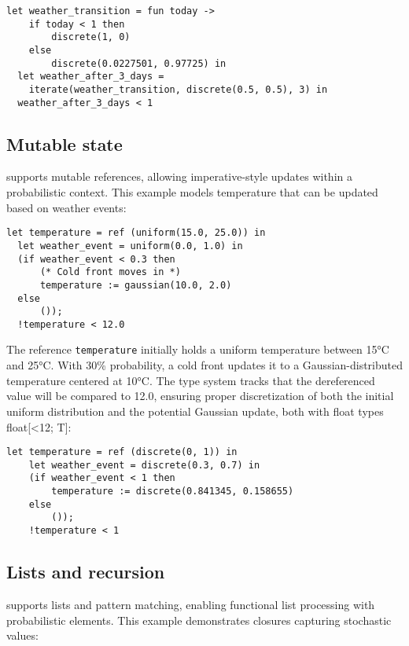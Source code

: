 \documentclass[acmsmall,screen,dvipsnames,x11names,nonacm,anonymous,review]{acmart}
\newcommand{\codetype}[1]{\textcolor{typecolor}{\ttfamily\small#1}}
\begin{document}
\begin{lstlisting}[aboveskip=1em,belowskip=1em,escapechar=!]
  let weather_transition = fun today -> 
    if today < 1 then
        discrete(1, 0)
    else
        discrete(0.0227501, 0.97725) in
  let weather_after_3_days = 
    iterate(weather_transition, discrete(0.5, 0.5), 3) in
  weather_after_3_days < 1
\end{lstlisting}


\subsection{Mutable state}

\Slice{} supports mutable references, allowing imperative-style updates within a probabilistic context. This example models temperature that can be updated based on weather events:

\begin{lstlisting}[aboveskip=1em,belowskip=1em,escapechar=!]
  let temperature = ref (uniform(15.0, 25.0)) in
  let weather_event = uniform(0.0, 1.0) in
  (if weather_event < 0.3 then
      (* Cold front moves in *)
      temperature := gaussian(10.0, 2.0)
  else
      ());
  !temperature < 12.0
\end{lstlisting}

\noindent The reference \texttt{temperature} initially holds a uniform temperature between 15°C and 25°C. With 30\% probability, a cold front updates it to a Gaussian-distributed temperature centered at 10°C. The type system tracks that the dereferenced value will be compared to 12.0, ensuring proper discretization of both the initial uniform distribution and the potential Gaussian update, both with float types \codetype{float[<12; T]}:

\begin{lstlisting}[aboveskip=1em,belowskip=1em,escapechar=!]
    let temperature = ref (discrete(0, 1)) in
    let weather_event = discrete(0.3, 0.7) in
    (if weather_event < 1 then
        temperature := discrete(0.841345, 0.158655)
    else
        ()); 
    !temperature < 1
\end{lstlisting}

\subsection{Lists and recursion}

\Slice{} supports lists and pattern matching, enabling functional list processing with probabilistic elements. This example demonstrates closures capturing stochastic values:
\end{document}
